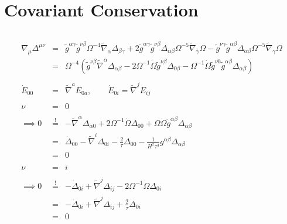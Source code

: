 \documentclass[10pt,letterpaper]{article}
\numberwithin{equation}{section}
\begin{document}
\section{Covariant Conservation}
\begin{eqnarray}
\\ \nonumber\\
\nabla_\mu \Delta^{\mu\nu} &=& \tilde{g}^{\alpha \gamma } \tilde{g}^{\nu \beta } \Omega^{-4} \tilde{\nabla}_{\alpha }\Delta_{\beta \gamma } + 2 \tilde{g}^{\alpha \gamma } \tilde{g}^{\nu \beta } \Delta_{\alpha \beta} \Omega^{-5} \tilde{\nabla}_{\gamma }\Omega -   \tilde{g}^{\nu \gamma }\tilde{g}^{\alpha \beta } \Delta_{\alpha\beta } \Omega^{-5} \tilde{\nabla}_{\gamma }\Omega 
\nonumber\\
&=& \Omega^{-4}(\tilde g^{\nu\beta}\tilde\nabla^\alpha \Delta_{\alpha\beta} - 2\Omega^{-1}\dot\Omega \tilde g^{\nu\beta} \Delta_{0\beta}
-\Omega^{-1}\dot\Omega \tilde g^{\nu 0}\tilde g^{\alpha\beta}\Delta_{\alpha\beta})
\\ \nonumber\\
\dot E_{00} &=& \tilde\nabla^a E_{0a},\qquad \dot E_{0i} = \tilde\nabla^j E_{ij}
\\ \nonumber\\
\nu &=& 0
\\ \nonumber\\
\implies 0&\overset{!}{=}&-\tilde\nabla^\alpha \Delta_{\alpha 0} + 2\Omega^{-1}\dot\Omega \Delta_{00}
+\Omega\dot\Omega \tilde g^{\alpha\beta}\Delta_{\alpha\beta}
\nonumber\\
&=& \dot \Delta_{00} - \tilde\nabla^i \Delta_{0i} - \frac{2}{\tau}\Delta_{00}-\frac{1}{H^2\tau^3} g^{\alpha\beta}\Delta_{\alpha\beta}
\nonumber\\
&=& 0
\\ \nonumber\\
\nu &=& i
\\ \nonumber\\
\implies 0&\overset{!}{=}&-\dot\Delta_{0i}+\tilde\nabla^j \Delta_{ij} -2\Omega^{-1}\dot\Omega \Delta_{0i}
\nonumber\\
&=& -\dot\Delta_{0i}+\tilde\nabla^j \Delta_{ij} +\frac{2}{\tau} \Delta_{0i}
\nonumber\\
&=& 0
\end{eqnarray}
\end{document}
